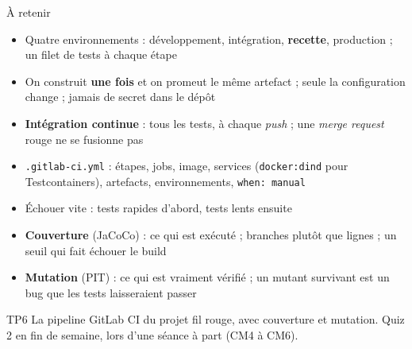 \documentclass[aspectratio=169,10pt]{beamer}
\begin{document}
\begin{frame}{À retenir}
  \footnotesize
  \begin{itemize}
    \item Quatre environnements : développement, intégration, \textbf{recette}, production ; un filet de tests à chaque étape
    \item On construit \textbf{une fois} et on promeut le même artefact ; seule la configuration change ; jamais de secret dans le dépôt
    \item \textbf{Intégration continue} : tous les tests, à chaque \textit{push} ; une \textit{merge request} rouge ne se fusionne pas
    \item \texttt{.gitlab-ci.yml} : étapes, jobs, image, services (\texttt{docker:dind} pour Testcontainers), artefacts, environnements, \texttt{when: manual}
    \item Échouer vite : tests rapides d'abord, tests lents ensuite
    \item \textbf{Couverture} (JaCoCo) : ce qui est exécuté ; branches plutôt que lignes ; un seuil qui fait échouer le build
    \item \textbf{Mutation} (PIT) : ce qui est vraiment vérifié ; un mutant survivant est un bug que les tests laisseraient passer
  \end{itemize}
  \vspace{1mm}
  \begin{exampleblock}{TP6}
    La pipeline GitLab CI du projet fil rouge, avec couverture et mutation. \alert{Quiz 2} en fin de semaine, lors d'une séance à part (CM4 à CM6).
  \end{exampleblock}
\end{frame}

\rquestionslide
\end{document}
